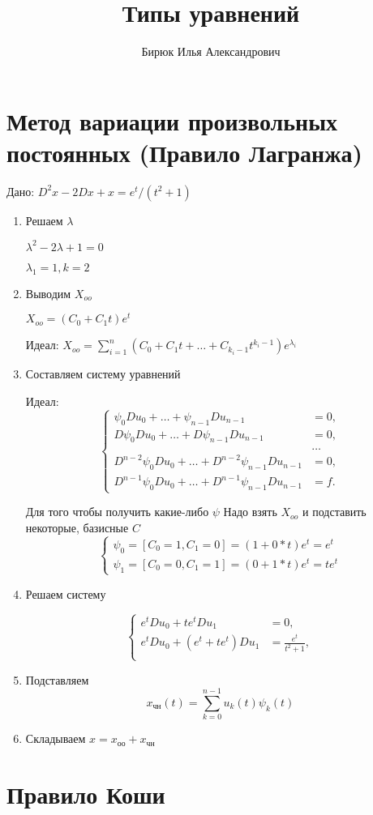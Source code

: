 \documentclass{article}
\title{Типы уравнений}
\author{Бирюк Илья Александрович}
\begin{document}
\maketitle
\newpage
\tableofcontents
\newpage
\section{Метод вариации произвольных постоянных (Правило Лагранжа)}
Дано: $D^2x-2Dx+x=e^t/(t^2+1)$
\begin{enumerate}
    \item Решаем $\lambda$

    $\lambda^2-2\lambda+1=0$
    
    $\lambda_1=1,k=2$
    \item Выводим $X_{oo}$
    
    $X_{oo}=(C_0+C_{1}t)e^{t}$

    Идеал: $X_{oo}=\sum_{i=1}^{n}(C_0+C_1t+\dots+C_{k_{i}-1}t^{k_i-1})e^{\lambda_i}$

    \item Составляем систему уравнений
    
    Идеал: 
    \[
\left\{
\begin{aligned}
    \psi_0 D u_0 + \dots + \psi_{n-1} D u_{n-1} &= 0, \\
    D \psi_0 D u_0 + \dots + D \psi_{n-1} D u_{n-1} &= 0, \\
    & \dots \\
    D^{n-2} \psi_0 D u_0 + \dots + D^{n-2} \psi_{n-1} D u_{n-1} &= 0, \\
    D^{n-1} \psi_0 D u_0 + \dots + D^{n-1} \psi_{n-1} D u_{n-1} &= f.
\end{aligned}
\right.
\]

Для того чтобы получить какие-либо $\psi$ Надо взять $X_{oo}$ и подставить некоторые, базисные $C$
\[
\left\{
\begin{aligned}
    \psi_0 = [C_0 = 1, C_1 = 0] = (1+0*t)e^{t} =  e^{t} \\
    \psi_1 = [C_0 = 0, C_1 = 1] = (0+1*t)e^{t} = te^{t}
\end{aligned}
\right.
\]
    \item Решаем систему
    
\[
\left\{
\begin{aligned}
    e^{t} D u_0 + te^{t} D u_{1} &= 0, \\
    e^{t} D u_0 + (e^{t}+te^{t}) D u_{1} &= \frac{e^{t}}{t^2+1}, \\
\end{aligned}
\right.
\]    

    \item Подставляем
    $$x_{\text{чн}}(t) = \sum_{k=0}^{n-1} u_k(t) \psi_k(t)$$
    \item Складываем
    $x=x_{\text{оо}}+x_{\text{чн}}$
\end{enumerate}
\newpage
\section{Правило Коши}
\end{document}
